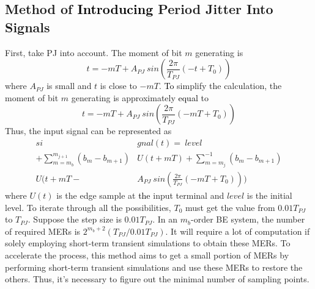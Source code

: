 \documentclass[conference]{IEEEtran}
\begin{document}
\subsection{Method of \textcolor{black}{Introducing} Period Jitter Into Signals}\label{IVB}

First, take PJ into account. The moment of bit $m$ generating is
\begin{equation}
t=-mT+A_{PJ}\ sin(\frac{2\pi}{T_{PJ}}(-t+T_0))
\label{eq5}
\end{equation}
where $A_{PJ}$ is small and $t$ is close to $-mT$. \textcolor{black}{To} simplify the calculation, the moment of bit $m$ generating is approximately \textcolor{black}{equal} to
\begin{equation}
t=-mT+A_{PJ}\ sin(\frac{2\pi}{T_{PJ}}(-mT+T_0))
\label{eq6}
\end{equation}
Thus, the input signal can be represented as
\begin{equation}
\begin{split}
si&gnal(t)=\ level\\
+\sum_{m=m_b}^{m_{j+1}}(b_m-b_{m+1})&U(t+mT)+\sum_{m=m_j}^{-1}(b_m-b_{m+1})\\
U(t+mT-&A_{PJ}\ sin(\frac{2\pi}{T_{PJ}}(-mT+T_0)))
\end{split}
\label{eq7}
\end{equation}
where $U(t)$ is the edge sample at \textcolor{black}{the} input terminal and $level$ is the initial level. To iterate through all the possibilities, $T_0$ must get the value from $0.01T_{PJ}$ to $T_{PJ}$.
\color{black}
Suppose the step size is $0.01T_{PJ}$.
\color{black}
In an $m_b$-order BE system,
\color{black}
the number of required MERs is $2^{m_b+2}(T_{PJ}/0.01T_{PJ})$. It will require a lot of computation if solely employing short-term transient simulations to obtain these MERs.
To accelerate the process, this method aims to get a small portion of MERs by performing short-term transient simulations and use these MERs to restore the others. Thus, it's necessary to figure out the minimal number of sampling points.
\color{black}
\end{document}
